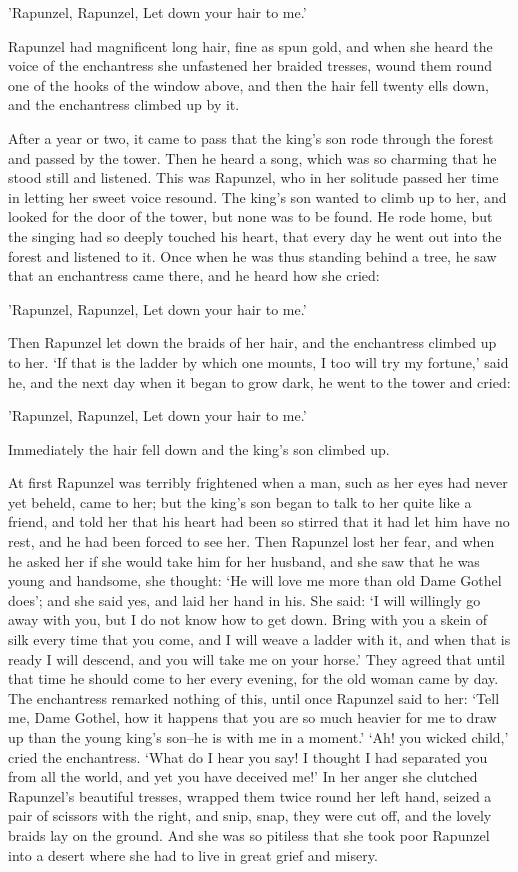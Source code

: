 \documentclass[oneside,11pt]{book} %
\begin{document}
'Rapunzel, Rapunzel,
Let down your hair to me.'

Rapunzel had magnificent long hair, fine as spun gold, and when she heard the voice of the enchantress she unfastened her braided tresses, wound them round one of the hooks of the window above, and then the hair fell twenty ells down, and the enchantress climbed up by it.

After a year or two, it came to pass that the king's son rode through the forest and passed by the tower. Then he heard a song, which was so charming that he stood still and listened. This was Rapunzel, who in her solitude passed her time in letting her sweet voice resound. The king's son wanted to climb up to her, and looked for the door of the tower, but none was to be found. He rode home, but the singing had so deeply touched his heart, that every day he went out into the forest and listened to it. Once when he was thus standing behind a tree, he saw that an enchantress came there, and he heard how she cried:

'Rapunzel, Rapunzel,
Let down your hair to me.'

Then Rapunzel let down the braids of her hair, and the enchantress climbed up to her. `If that is the ladder by which one mounts, I too will try my fortune,' said he, and the next day when it began to grow dark, he went to the tower and cried:

'Rapunzel, Rapunzel,
Let down your hair to me.'

Immediately the hair fell down and the king's son climbed up.

At first Rapunzel was terribly frightened when a man, such as her eyes had never yet beheld, came to her; but the king's son began to talk to her quite like a friend, and told her that his heart had been so stirred that it had let him have no rest, and he had been forced to see her. Then Rapunzel lost her fear, and when he asked her if she would take him for her husband, and she saw that he was young and handsome, she thought: `He will love me more than old Dame Gothel does'; and she said
yes, and laid her hand in his. She said: `I will willingly go away with you, but I do not know how to get down. Bring with you a skein of silk every time that you come, and I will weave a ladder with it, and when that is ready I will descend, and you will take me on your horse.' They agreed that until that time he should come to her every evening, for the old woman came by day. The enchantress remarked nothing of this, until once Rapunzel said to her: `Tell me, Dame Gothel, how it happens that you are so much heavier for me to draw up than the young king's son--he is with me in a moment.' `Ah! you wicked child,' cried the enchantress. `What do I hear you say! I thought I had separated you from all the world, and yet you have deceived me!' In her anger she clutched Rapunzel's beautiful tresses, wrapped them twice round her left hand, seized a pair of scissors with the right, and snip, snap, they were cut off, and the lovely braids lay on the ground. And she was so pitiless that she took poor Rapunzel into a desert where she had to live in great grief and misery.
\end{document}
